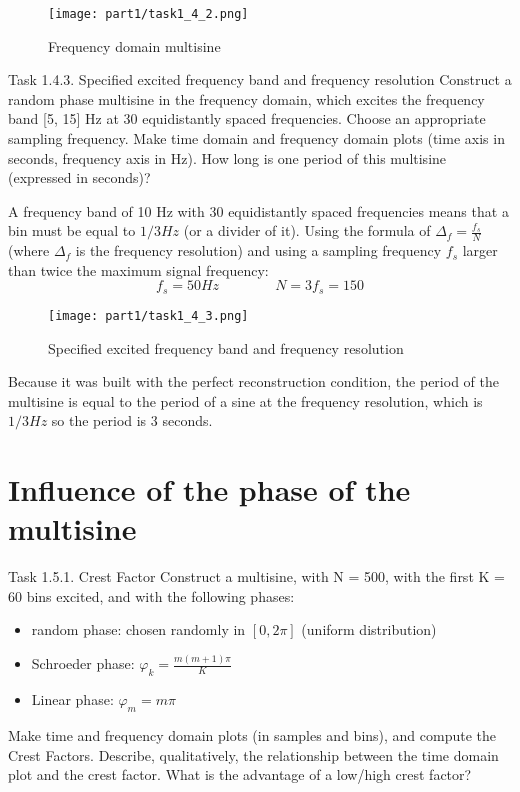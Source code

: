 \begin{figure}[H]
    \centering
    \texttt{[image: part1/task1\_4\_2.png]}
    \caption{Frequency domain multisine}
\end{figure}

\begin{Task}{Task 1.4.3. Specified excited frequency band and frequency resolution}
    Construct a random phase multisine in the frequency domain, which excites the frequency band [5, 15] Hz at 30 equidistantly spaced frequencies. Choose an appropriate sampling frequency. Make time domain and frequency domain plots (time axis in seconds, frequency axis in Hz). How long is one period of this multisine (expressed in seconds)?
\end{Task}

A frequency band of 10 Hz with 30 equidistantly spaced frequencies means that a bin must be equal to $1/3 Hz$ (or a divider of it). Using the formula of $\Delta_f = \frac{f_s}{N}$ (where $\Delta_f$ is the frequency resolution) and using a sampling frequency $f_s$ larger than twice the maximum signal frequency:
\begin{equation*}
    f_s = 50 Hz \quad\quad\quad\quad N = 3 f_s = 150
\end{equation*}

\begin{figure}[H]
    \centering
    \texttt{[image: part1/task1\_4\_3.png]}
    \caption{Specified excited frequency band and frequency resolution}
\end{figure}

Because it was built with the perfect reconstruction condition, the period of the multisine is equal to the period of a sine at the frequency resolution, which is $1/3 Hz$ so the period is $3$ seconds.

\section{Influence of the phase of the multisine}

\begin{Task}{Task 1.5.1. Crest Factor}
    Construct a multisine, with N = 500, with the first K = 60 bins excited, and with the following phases:
    \begin{itemize}
        \item random phase: chosen randomly in $[0, 2\pi]$ (uniform distribution)
        \item Schroeder phase: $\varphi_k = \frac{m(m+1)\pi}{K}$
        \item Linear phase: $\varphi_m = m\pi$
    \end{itemize}
    Make time and frequency domain plots (in samples and bins), and compute the Crest Factors. Describe, qualitatively, the relationship between the time domain plot and the crest factor. What is the advantage of a low/high crest factor?
\end{Task}

